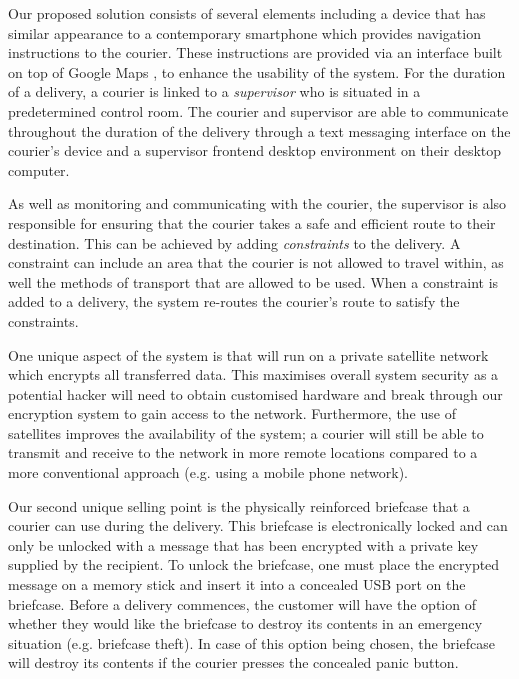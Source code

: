 

Our proposed solution consists of several elements including a device that has similar appearance to a contemporary smartphone which provides navigation instructions to the courier. These instructions are provided via an interface built on top of Google Maps \cite{GoogleMaps}, to enhance the usability of the system. For the duration of a delivery, a courier is linked to a \textit{supervisor} who is situated in a predetermined control room. The courier and supervisor are able to communicate throughout the duration of the delivery through a text messaging interface on the courier’s device and a supervisor frontend desktop environment on their desktop computer.

As well as monitoring and communicating with the courier, the supervisor is also responsible for ensuring that the courier takes a safe and efficient route to their destination. This can be achieved by adding \textit{constraints} to the delivery. A constraint can include an area that the courier is not allowed to travel within, as well the methods of transport that are allowed to be used. When a constraint is added to a delivery, the system re-routes the courier's route to satisfy the constraints.

One unique aspect of the system is that will run on a private satellite network which encrypts all transferred data. This maximises overall system security as a potential hacker will need to obtain customised hardware and break through our encryption system to gain access to the network. Furthermore, the use of satellites improves the availability of the system; a courier will still be able to transmit and receive to the network in more remote locations compared to a more conventional approach (e.g. using a mobile phone network).

Our second unique selling point is the physically reinforced briefcase that a courier can use during the delivery. This briefcase is electronically locked and can only be unlocked with a message that has been encrypted with a private key supplied by the recipient. To unlock the briefcase, one must place the encrypted message on a memory stick and insert it into a concealed USB port on the briefcase. Before a delivery commences, the customer will have the option of whether they would like the briefcase to destroy its contents in an emergency situation (e.g. briefcase theft). In case of this option being chosen, the briefcase will destroy its contents if the courier presses the concealed panic button.

